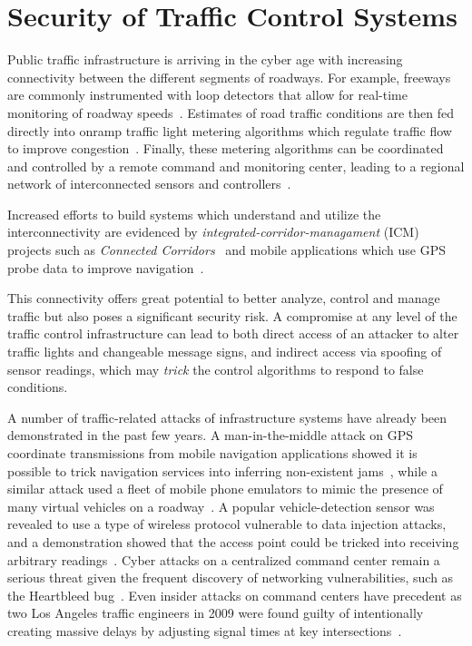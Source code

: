 \chapter{Security of Traffic Control Systems}
\label{chapter:security}

Public traffic infrastructure is arriving in the cyber age with increasing connectivity between the different segments of roadways. For example, freeways are commonly instrumented with loop detectors that allow for real-time monitoring of roadway speeds~\cite{jia2001pems}. Estimates of road traffic conditions are then fed directly into onramp traffic light metering algorithms which regulate traffic flow to improve congestion~\cite{Papageorgiou1991}. Finally, these metering algorithms can be coordinated and controlled by a remote command and monitoring center, leading to a regional network of interconnected sensors and controllers~\cite{Reilly2013b}.

Increased efforts to build systems which understand and utilize the interconnectivity are evidenced by \emph{integrated-corridor-managament} (ICM) projects such as \emph{Connected Corridors}~\cite{miller2010san} and mobile applications which use GPS probe data to improve navigation~\cite{Work2010Traffic}.

This connectivity offers great potential to better analyze, control and manage traffic but also poses a significant security risk. A compromise at any level of the traffic control infrastructure can lead to both direct access of an attacker to alter traffic lights and changeable message signs, and indirect access via spoofing of sensor readings, which may \emph{trick} the control algorithms to respond to false conditions.

A number of traffic-related attacks of infrastructure systems have already been demonstrated in the past few years. A man-in-the-middle attack on GPS coordinate transmissions from mobile navigation applications showed it is possible to trick navigation services into inferring non-existent jams~\cite{jeske2013floating}, while a similar attack used a fleet of mobile phone emulators to mimic the presence of many virtual vehicles on a roadway~\cite{TUFNELL2014}. A popular vehicle-detection sensor was revealed to use a type of wireless protocol vulnerable to data injection attacks, and a demonstration showed that the access point could be tricked into receiving arbitrary readings~\cite{Zetter2014Custom}. Cyber attacks on a centralized command center remain a serious threat given the frequent discovery of networking vulnerabilities, such as the Heartbleed bug~\cite{Codenomicon2014}. Even insider attacks on command centers have precedent as two Los Angeles traffic engineers in 2009 were found guilty of intentionally creating massive delays by adjusting signal times at key intersections~\cite{Grad2009Custom}.

